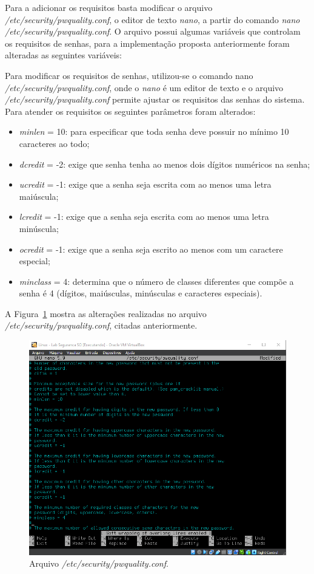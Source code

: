\documentclass[
    12pt,				%
    oneside,   	        %
    a4paper,			%
    english,			%
    french,				%
    spanish,			%
    brazil,				%
    ]{pacotes/abntex2}
\begin{document}
Para a adicionar os requisitos basta modificar o arquivo \textit{/etc/security/pwquality.conf}, o editor de texto \textit{nano}, a partir do comando \textit{nano /etc/security/pwquality.conf}. O arquivo possui algumas variáveis que controlam os requisitos de senhas, para a implementação proposta anteriormente foram alteradas as seguintes variáveis:

Para modificar os requisitos de senhas, utilizou-se o comando nano \textit{/etc/security/pwquality.conf}, onde o \textit{nano} é um editor de texto e o arquivo \textit{/etc/security/pwquality.conf} permite ajustar os requisitos das senhas do sistema. Para atender os requisitos os seguintes parâmetros foram alterados:

\begin{itemize}
    \item \textit{minlen} = 10: para especificar que toda senha deve possuir no mínimo 10 caracteres ao todo;
    \item \textit{dcredit} = -2: exige que senha tenha ao menos dois dígitos numéricos na senha;
    \item \textit{ucredit} = -1: exige que a senha seja escrita com ao menos uma letra maiúscula;
    \item \textit{lcredit} = -1: exige que a senha seja escrita com ao menos uma letra minúscula;
    \item \textit{ocredit} = -1: exige que a senha seja escrito ao menos com um caractere especial;
    \item \textit{minclass} = 4: determina que o número de classes diferentes que compõe a senha é 4 (dígitos, maiúsculas, minúsculas e caracteres especiais).
\end{itemize}

A Figura~\ref{fig:pwquality} mostra as alterações realizadas no arquivo \textit{/etc/security/pwquality.conf}, citadas anteriormente.

\begin{figure}[H]
  \centering
  \includegraphics[scale=0.7]{figuras/nano_pwquality.png}
  \caption{Arquivo \textit{/etc/security/pwquality.conf}.}
  \label{fig:pwquality}
\end{figure}
\end{document}
